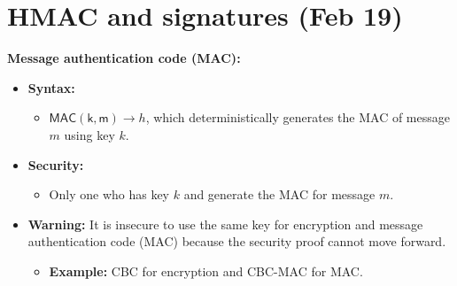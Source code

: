 \documentclass{article}
\newcommand{\msf}[1]{\mathsf{#1}}
\newcommand{\parhead}[1]{\noindent \textbf{#1}}
\begin{document}
\newpage
\section{HMAC and signatures (Feb 19)}

\parhead{Message authentication code (MAC):}
\begin{itemize}
    \item {\bf Syntax:}
    \begin{itemize}
        \item $\msf{MAC}(\msf{k},\msf{m})\rightarrow h$, which deterministically generates the MAC of message $m$ using key $k$.
    \end{itemize}
    
    \item {\bf Security:}
    \begin{itemize}
        \item Only one who has key $k$ and generate the MAC for message $m$.
    \end{itemize}
    
    \item {\bf Warning:} It is insecure to use the same key for encryption and message authentication code (MAC) because the security proof cannot move forward. 
    \begin{itemize}
        \item {\bf Example:} CBC for encryption and CBC-MAC for MAC. 
    \end{itemize}
\end{itemize}
\end{document}
